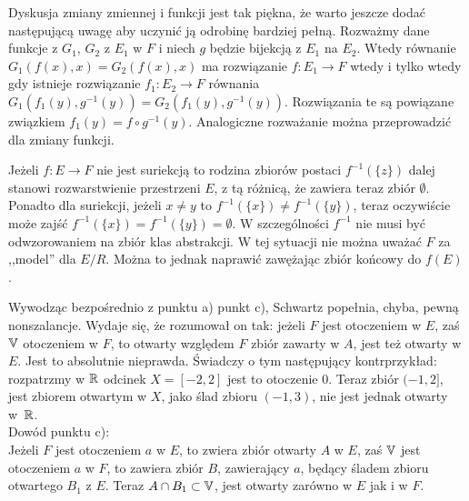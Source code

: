 \documentclass[a4paper,11pt]{article}
\begin{document}
\vspace{\spaceFour}


\start {} Dyskusja zmiany zmiennej i funkcji jest tak piękna, że
warto jeszcze dodać następującą uwagę aby uczynić ją odrobinę bardziej
pełną. Rozważmy dane funkcje z $G_{ 1 }$, $G_{ 2 }$ z $E_{ 1 }$ w $F$
i niech $g$ będzie bijekcją z $E_{ 1 }$ na $E_{ 2 }$. Wtedy równanie
$G_{ 1 }( f( x ), x ) = G_{ 2 }( f( x ), x )$ ma rozwiązanie
$f : E_{ 1 } \to F$ wtedy i tylko wtedy gdy istnieje rozwiązanie
$f_{ 1 } : E_{ 2 } \to F$ równania
$G_{ 1 }( f_{ 1 }( y ), g^{ -1 }( y ) ) = G_{ 2 }( f_{ 1 }( y ), g^{
  -1 }( y ) )$. Rozwiązania te są powiązane związkiem
$f_{ 1 }( y ) = f \circ g^{ -1 }( y )$. Analogiczne rozważanie można
przeprowadzić dla zmiany funkcji.

\vspace{\spaceFour}


\start {} Jeżeli $f : E \to F$ nie jest suriekcją to rodzina
zbiorów postaci $f^{ -1 } ( \{ z\} )$ dalej stanowi rozwarstwienie
przestrzeni $E$, z tą różnicą, że zawiera teraz zbiór $\emptyset$.
Ponadto dla suriekcji, jeżeli $x \neq y$ to
$f^{ -1 }( \{ x \} ) \neq f^{ -1 } ( \{ y\} )$, teraz oczywiście może
zajść $f^{ -1 }( \{ x \} ) = f^{ -1 }( \{ y \} ) = \emptyset$. W
szczególności $f^{ -1 }$ nie musi być odwzorowaniem na zbiór klas
abstrakcji. W tej sytuacji nie można uważać $F$ za ,,model'' dla
$E / R$. Można to jednak naprawić zawężając zbiór końcowy do $f( E )$.

\vspace{\spaceFour}


\start {} Wywodząc bezpośrednio z punktu a) punkt c), Schwartz
popełnia, chyba, pewną nonszalancje. Wydaje się, że rozumował on tak:
jeżeli $F$ jest otoczeniem w $E$, zaś $\mathbb{V}$ otoczeniem w $F$, to
otwarty względem $F$ zbiór zawarty w $A$, jest też otwarty w $E$. Jest
to absolutnie nieprawda. Świadczy o tym następujący kontrprzykład:
rozpatrzmy w $\mathbb{R}$ odcinek $X = [ -2, 2 ]$ jest to otoczenie 0. Teraz
zbiór $( -1, 2 ]$, jest zbiorem otwartym
w $X$, jako ślad zbioru $( -1, 3 )$, nie jest jednak otwarty w~$\mathbb{R}$.\\
Dowód punktu c):\\
Jeżeli $F$ jest otoczeniem $a$ w $E$, to zwiera zbiór otwarty $A$ w
$E$, zaś $\mathbb{V}$ jest otoczeniem $a$ w $F$, to zawiera zbiór $B$,
zawierający $a$, będący śladem zbioru otwartego $B_{ 1 }$ z $E$. Teraz
$A \cap B_{ 1 } \subset \mathbb{V}$, jest otwarty zarówno w $E$ jak i w $F$.

\vspace{\spaceFour}
\end{document}
